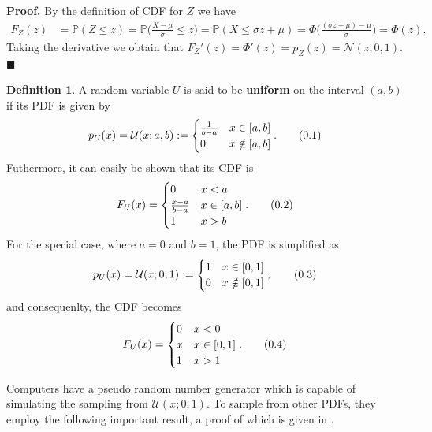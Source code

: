 \documentclass[10pt]{article}
\theoremstyle{definition}
\newtheorem{defn}{Definition}[section]
\theoremstyle{definition}
\theoremstyle{remark}
\newenvironment{prf}{\noindent\textbf{Proof.}}{\hfill$\blacksquare$}
\newcommand\eqnum{\addtocounter{equation}{1}\tag{\arabic{section}.\arabic{equation}}}
\begin{document}
\begin{prf}
By the definition of CDF for $Z$ we have
\begin{align*}
F_Z(z) &= \mathbb{P}(Z \leq z) = \mathbb{P}\Big(\frac{X-\mu}{\sigma} \leq z\Big) 
= \mathbb{P}(X \leq \sigma z + \mu) = \Phi\Big(\frac{(\sigma z + \mu)-\mu}{\sigma}\Big) = \Phi(z) .
\end{align*}
Taking the derivative we obtain that $F_Z'(z) = \Phi'(z) = p_Z(z) = \mathcal{N}(z; 0, 1)$.
\end{prf}
\begin{defn}
A random variable $U$ is said to be \textbf{uniform} on the interval $(a, b)$ if its PDF is given by
\begin{equation*}
p_U(x) = \mathcal{U}(x; a, b) :=
\begin{cases} 
\frac{1}{b-a} & x \in [a, b] \\
0 & x \notin [a, b]
\end{cases}.
\eqnum
\end{equation*}
Futhermore, it can easily be shown that its CDF is
\begin{equation*}
F_U(x) = 
\begin{cases} 
0 & x < a \\
\frac{x-a}{b-a} & x \in [a, b] \\
1 & x>b
\end{cases}.
\eqnum
\end{equation*}
For the special case, where $a=0$ and $b=1$, the PDF is simplified as
\begin{equation*}
p_U(x) = \mathcal{U}(x; 0, 1) :=
\begin{cases} 
1 & x \in [0, 1] \\
0 & x \notin [0, 1]
\end{cases},
\eqnum
\end{equation*}
and consequenlty, the CDF becomes
\begin{equation*}
F_U(x) = 
\begin{cases} 
0 & x < 0 \\
x & x \in [0, 1] \\
1 & x>1
\end{cases}.
\eqnum
\end{equation*}
\end{defn}
 Computers have a pseudo random number generator which is capable of simulating the sampling from $\mathcal{U}(x; 0, 1)$. To sample from other PDFs, they employ the following important result, a proof of which is given in \cite{Gharamani2019}.
\end{document}
